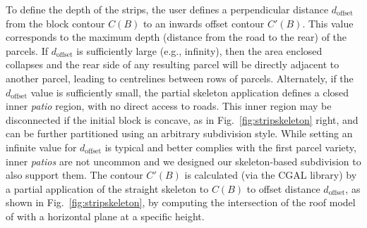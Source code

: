 %

To define the depth of the strips, the user defines a perpendicular distance $d_{\text{offset}}$ from the block contour $C(B)$ to an inwards offset contour $C'(B)$.
This value corresponds to the maximum depth (distance from the road to the rear) of the parcels.
If $d_{\text{offset}}$ is sufficiently large (e.g., infinity), then the area enclosed collapses and
the rear side of any resulting parcel will be directly adjacent to another parcel, leading to centrelines between rows of parcels.
Alternately, if the $d_{\text{offset}}$ value is sufficiently small, the partial skeleton application defines 
a closed inner \emph{patio} region, with no direct access to roads. This inner region may be disconnected if the initial block is concave, as in Fig.~\ref{fig:stripskeleton} right, and can be further partitioned using an arbitrary subdivision style.
While setting an infinite value for $d_{\text{offset}}$ is typical and better complies with the first parcel variety,
inner \emph{patios} are not uncommon and we designed our skeleton-based subdivision to also support them.
The contour $C'(B)$ is calculated (via the CGAL\cite{cgal} library) by a partial application of the straight skeleton to $C(B)$ to offset distance $d_{\text{offset}}$, as shown in Fig.~\ref{fig:stripskeleton}, 
by computing the intersection of the roof model of \cite{Aichholzer95} with a horizontal plane at a specific height.

